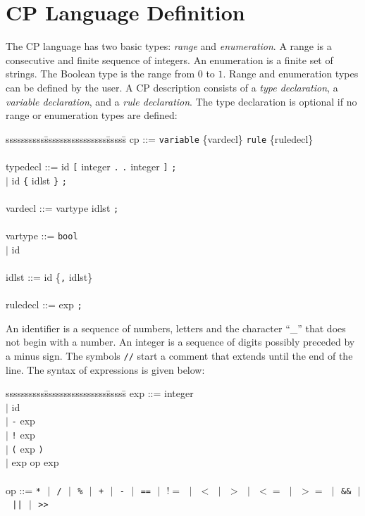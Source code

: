 \documentclass{article}
\begin{document}
\section{CP Language Definition}
\label{sec:cpl}
The CP language has two basic types: {\em range} and {\em
enumeration}. A range is a consecutive and finite sequence of
integers. An enumeration is a finite set of strings. The Boolean type
is the range from $0$ to $1$. Range and enumeration types can be
defined by the user. A CP description consists of a {\em type
declaration}, a {\em variable declaration}, and a {\em rule
declaration}. The type declaration is optional if no range or
enumeration types are defined:
\begin{tabbing}
ssssssssss\=ssssssssssssssss\=sssss\= \kill
\>cp            \>::=  \texttt{variable} \{vardecl\} \texttt{rule} \{ruledecl\} \\
\\
\>typedecl       \>::= \>id \texttt{[} integer \texttt{.} \texttt{.} integer \texttt{]} \texttt{;}\\
\>               \>$|$   \>id \texttt{\{} idlst \texttt{\}} \texttt{;}\\
\\
\>vardecl        \>::= \>vartype idlst \texttt{;}\\
\\
\>vartype        \>::= \>\texttt{bool}\\
\>               \>$|$   \>id\\
\\
\>idlst          \>::= \>id \{\texttt{,} idlst\}\\
\\
\>ruledecl       \>::= \>exp \texttt{;}\\
\end{tabbing}
An identifier is a sequence of numbers, letters and the character
``\_'' that does not begin with a number. An integer is a sequence of
digits possibly preceded by a minus sign. The symbols \texttt{//} start
a comment that extends until the end of the line. The syntax of expressions is
given below:
\begin{tabbing} ssssssssss\=ssssssssssssssss\=sssss\= \kill
\>exp     \>::= \>integer\\
\>        \>$|$   \>id\\
\>        \>$|$ \>\texttt{-} exp\\
\>        \>$|$ \>\texttt{!} exp\\
\>        \>$|$ \>\texttt{(} exp \texttt{)}\\
\>        \>$|$ \>exp op exp\\
\\
\>op      \>::= \>\texttt{*} \,\,$|$\,\, \texttt{/}  \,\,$|$\,\, \texttt{\%} \,\,$|$\,\, \texttt{+} \,\,$|$\,\, \texttt{-} \,\,$|$\,\, \texttt{==} \,\,$|$\,\, \texttt{$!=$} \,\,$|$\,\, \texttt{$<$} \,\,$|$\,\, \texttt{$>$} \,\,$|$\,\, \texttt{$<=$} \,\,$|$\,\, \texttt{$>=$} \,\,$|$\,\, \texttt{\&\&} \,\,$|$\,\, \texttt{||} \,\,$|$\,\, \texttt{>>} 
\end{tabbing}
\end{document}
